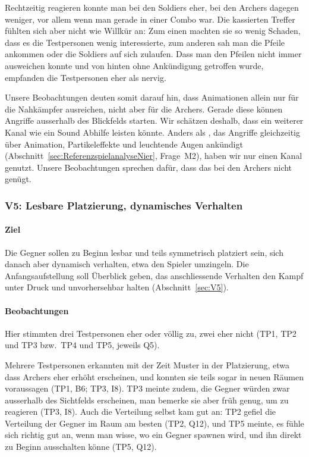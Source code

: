 \documentclass[../Main.tex]{subfiles}
\begin{document}
Rechtzeitig reagieren konnte man bei den Soldiers eher, bei den Archers dagegen weniger, vor allem wenn man gerade in einer Combo war. Die kassierten Treffer fühlten sich aber nicht wie Willkür an: Zum einen machten sie so wenig Schaden, dass es die Testpersonen wenig interessierte, zum anderen sah man die Pfeile ankommen oder die Soldiers auf sich zulaufen. Dass man den Pfeilen nicht immer ausweichen konnte und von hinten ohne Ankündigung getroffen wurde, empfanden die Testpersonen eher als nervig.

Unsere Beobachtungen deuten somit darauf hin, dass Animationen allein nur für die Nahkämpfer ausreichen, nicht aber für die Archers. Gerade diese können Angriffe ausserhalb des Blickfelds starten. Wir schätzen deshalb, dass ein weiterer Kanal wie ein Sound Abhilfe leisten könnte. Anders als , das Angriffe gleichzeitig über Animation, Partikeleffekte und leuchtende Augen ankündigt (Abschnitt~\ref{sec:ReferenzspielanalyseNier}, Frage~M2), haben wir nur einen Kanal genutzt. Unsere Beobachtungen sprechen dafür, dass das bei den Archers nicht genügt.

\subsubsection{V5: Lesbare Platzierung, dynamisches Verhalten}

\paragraph{Ziel}
Die Gegner sollen zu Beginn lesbar und teils symmetrisch platziert sein, sich danach aber dynamisch verhalten, etwa den Spieler umzingeln. Die Anfangsaufstellung soll Überblick geben, das anschliessende Verhalten den Kampf unter Druck und unvorhersehbar halten (Abschnitt~\ref{sec:V5}).

\paragraph{Beobachtungen}
Hier stimmten drei Testpersonen eher oder völlig zu, zwei eher nicht (TP1, TP2 und TP3 bzw.\ TP4 und TP5, jeweils Q5).

Mehrere Testpersonen erkannten mit der Zeit Muster in der Platzierung, etwa dass Archers eher erhöht erscheinen, und konnten sie teils sogar in neuen Räumen voraussagen (TP1, B6; TP3, I8). TP3 meinte zudem, die Gegner würden zwar ausserhalb des Sichtfelds erscheinen, man bemerke sie aber früh genug, um zu reagieren (TP3, I8). Auch die Verteilung selbst kam gut an: TP2 gefiel die Verteilung der Gegner im Raum am besten (TP2, Q12), und TP5 meinte, es fühle sich richtig gut an, wenn man wisse, wo ein Gegner spawnen wird, und ihn direkt zu Beginn ausschalten könne (TP5, Q12).
\end{document}
